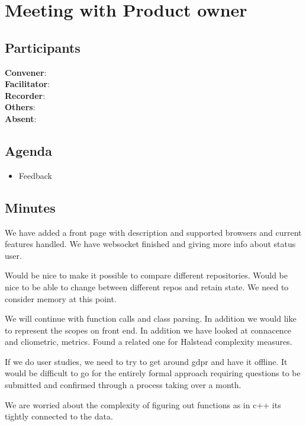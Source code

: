 \section*{Meeting with Product owner}

\subsection*{Participants}
\textbf{Convener}: \productowner{}\\
\textbf{Facilitator}: \facilitator{}  \\
\textbf{Recorder}: \scrummaster{}  \\
\textbf{Others}: \groupleader{} \\
\textbf{Absent}: 

\subsection*{Agenda}
\begin{itemize}
    \item Feedback
\end{itemize}

\subsection*{Minutes}
We have added a front page with description and supported browsers and current features handled. 
We have websocket finished and giving more info about status user.

Would be nice to make it possible to compare different repositories. Would be nice to be able to change between different repos and retain state. 
We need to consider memory at this point.

We will continue with function calls and class parsing. In addition we would like to represent the scopes on front end. In addition we have looked at connacence and cliometric, metrics. Found a related one for Halstead complexity measures. 

If we do user studies, we need to try to get around gdpr and have it offline. It would be difficult to go for the entirely formal approach requiring questions to be submitted and confirmed through a process taking over a month. 

We are worried about the complexity of figuring out functions as in c++ its tightly connected to the data. 


\newpage
